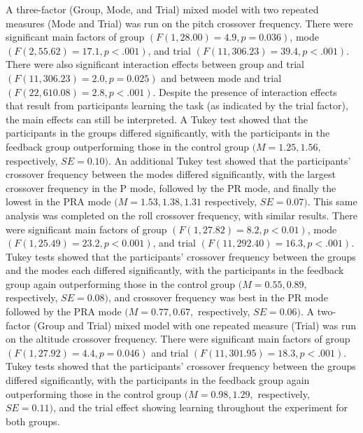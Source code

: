 A three-factor (Group, Mode, and Trial) mixed model with two repeated measures (Mode and Trial) was run on the pitch crossover frequency.
There were significant main factors of group $(F(1, 28.00) = 4.9, p = 0.036)$, mode $(F(2, 55.62) = 17.1, p < .001)$, and trial $(F(11, 306.23) = 39.4, p < .001)$.
There were also significant interaction effects between group and trial $(F(11, 306.23) = 2.0, p = 0.025)$ and between mode and trial $(F(22, 610.08) = 2.8, p < .001)$.
Despite the presence of interaction effects that result from participants learning the task (as indicated by the trial factor), the main effects can still be interpreted.
A Tukey test showed that the participants in the groups differed significantly, with the participants in the feedback group outperforming those in the control group $(M = 1.25, 1.56,$ respectively, $SE = 0.10)$.
An additional Tukey test showed that the participants' crossover frequency between the modes differed significantly, with the largest crossover frequency in the P mode, followed by the PR mode, and finally the lowest in the PRA mode $(M = 1.53, 1.38, 1.31$ respectively, $SE = 0.07)$.
This same analysis was completed on the roll crossover frequency, with similar results.
There were significant main factors of group $(F(1, 27.82) = 8.2, p < 0.01)$, mode $(F(1, 25.49) = 23.2, p < 0.001)$, and trial $(F(11, 292.40) = 16.3, p < .001)$.
Tukey tests showed that the participants' crossover frequency between the groups and the modes each differed significantly, with the participants in the feedback group again outperforming those in the control group $(M = 0.55, 0.89,$ respectively, $SE = 0.08)$, and crossover frequency was best in the PR mode followed by the PRA mode $(M = 0.77, 0.67,$ respectively, $SE = 0.06)$.
A two-factor (Group and Trial) mixed model with one repeated measure (Trial) was run on the altitude crossover frequency.
There were significant main factors of group $(F(1, 27.92) = 4.4, p = 0.046)$ and trial $(F(11, 301.95) = 18.3, p < .001)$.
Tukey tests showed that the participants' crossover frequency between the groups differed significantly, with the participants in the feedback group again outperforming those in the control group $(M = 0.98, 1.29,$ respectively, $SE = 0.11)$, and the trial effect showing learning throughout the experiment for both groups.

